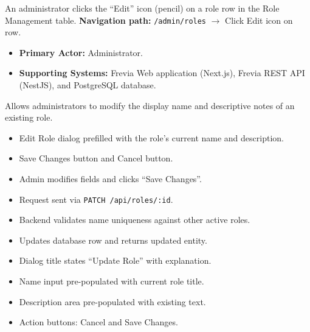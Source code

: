 An administrator clicks the ``Edit'' icon (pencil) on a role row in the Role Management table.\newline
\textbf{Navigation path:} \texttt{/admin/roles} $\rightarrow$ Click Edit icon on row.


\begin{itemize}[leftmargin=1.6em,topsep=3pt,itemsep=2pt,parsep=0pt,label=$\bullet$]
    \item \textbf{Primary Actor:} Administrator.
    \item \textbf{Supporting Systems:} Frevia Web application (Next.js), Frevia REST API (NestJS), and PostgreSQL database.
\end{itemize}

\noindent Allows administrators to modify the display name and descriptive notes of an existing role.

\begin{itemize}[leftmargin=1.6em,topsep=3pt,itemsep=2pt,parsep=0pt,label=$\bullet$]
    \item Edit Role dialog prefilled with the role's current name and description.
    \item Save Changes button and Cancel button.
\end{itemize}

\begin{itemize}[leftmargin=1.6em,topsep=3pt,itemsep=2pt,parsep=0pt,label=$\bullet$]
    \item Admin modifies fields and clicks ``Save Changes''.
    \item Request sent via \texttt{PATCH /api/roles/:id}.
    \item Backend validates name uniqueness against other active roles.
    \item Updates database row and returns updated entity.
\end{itemize}

\begin{itemize}[leftmargin=1.6em,topsep=3pt,itemsep=2pt,parsep=0pt,label=$\bullet$]
    \item Dialog title states ``Update Role'' with explanation.
    \item Name input pre-populated with current role title.
    \item Description area pre-populated with existing text.
    \item Action buttons: Cancel and Save Changes.
\end{itemize}

